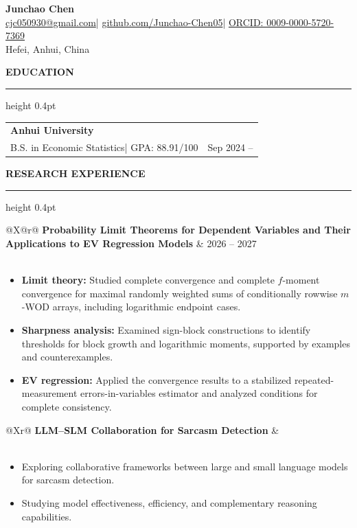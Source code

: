 \documentclass[11pt,a4paper]{article}
\newcommand{\cvsection}[1]{%
  \vspace{0.9em}%
  {\bfseries\normalsize\MakeUppercase{#1}}\par\vspace{0.18em}%
  \hrule height 0.4pt\vspace{0.45em}%
}
\newcommand{\cvbulletsstart}{\begin{itemize}[leftmargin=2.15em,topsep=0.3em,itemsep=0.22em,parsep=0pt]}
\newcommand{\cvbulletsend}{\end{itemize}}
\begin{document}
\begin{center}
  {\Large\bfseries Junchao Chen {\normalsize}}\\[0.35em]
  \href{mailto:cjc050930@gmail.com}{cjc050930@gmail.com}\quad | \quad
  \href{https://github.com/Junchao-Chen05}{github.com/Junchao-Chen05}\quad | \quad
  \href{https://orcid.org/0009-0000-5720-7369}{ORCID: 0009-0000-5720-7369}\\[0.2em]
  Hefei, Anhui, China
\end{center}

\cvsection{Education}
\begin{tabularx}{\linewidth}{@{}Xr@{}}
  \textbf{Anhui University} & \\
  B.S. in Economic Statistics\quad | \quad GPA: 88.91/100 & Sep 2024 -- \\
\end{tabularx}

\cvsection{Research Experience}
\begin{tabularx}{\linewidth}{@{}X@{\hspace{1.2em}}r@{}}
  \textbf{Probability Limit Theorems for Dependent Variables and Their Applications to EV Regression Models}
  & 2026 -- 2027 \\
  \\
\end{tabularx}
\cvbulletsstart
  \item \textbf{Limit theory:} Studied complete convergence and complete $f$-moment convergence for maximal randomly weighted sums of conditionally rowwise $m$-WOD arrays, including logarithmic endpoint cases.
  \item \textbf{Sharpness analysis:} Examined sign-block constructions to identify thresholds for block growth and logarithmic moments, supported by examples and counterexamples.
  \item \textbf{EV regression:} Applied the convergence results to a stabilized repeated-measurement errors-in-variables estimator and analyzed conditions for complete consistency.
\cvbulletsend

\vspace{0.3em}
\begin{tabularx}{\linewidth}{@{}Xr@{}}
  \textbf{LLM--SLM Collaboration for Sarcasm Detection} & \\
  \\
\end{tabularx}
\cvbulletsstart
  \item Exploring collaborative frameworks between large and small language models for sarcasm detection.
  \item Studying model effectiveness, efficiency, and complementary reasoning capabilities.
\cvbulletsend
\end{document}
